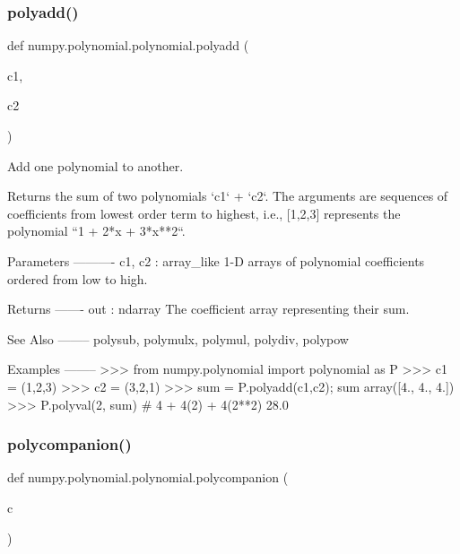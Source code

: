 \subsubsection{\texorpdfstring{polyadd()}{polyadd()}}
{\footnotesize\ttfamily def numpy.\+polynomial.\+polynomial.\+polyadd (\begin{DoxyParamCaption}\item[{}]{c1,  }\item[{}]{c2 }\end{DoxyParamCaption})}

\begin{DoxyVerb}Add one polynomial to another.

Returns the sum of two polynomials `c1` + `c2`.  The arguments are
sequences of coefficients from lowest order term to highest, i.e.,
[1,2,3] represents the polynomial ``1 + 2*x + 3*x**2``.

Parameters
----------
c1, c2 : array_like
    1-D arrays of polynomial coefficients ordered from low to high.

Returns
-------
out : ndarray
    The coefficient array representing their sum.

See Also
--------
polysub, polymulx, polymul, polydiv, polypow

Examples
--------
>>> from numpy.polynomial import polynomial as P
>>> c1 = (1,2,3)
>>> c2 = (3,2,1)
>>> sum = P.polyadd(c1,c2); sum
array([4.,  4.,  4.])
>>> P.polyval(2, sum) # 4 + 4(2) + 4(2**2)
28.0\end{DoxyVerb}
 \mbox{\label{namespacenumpy_1_1polynomial_1_1polynomial_a1a221c5711e3e7eb846da623d766e2be}} 
\subsubsection{\texorpdfstring{polycompanion()}{polycompanion()}}
{\footnotesize\ttfamily def numpy.\+polynomial.\+polynomial.\+polycompanion (\begin{DoxyParamCaption}\item[{}]{c }\end{DoxyParamCaption})}

